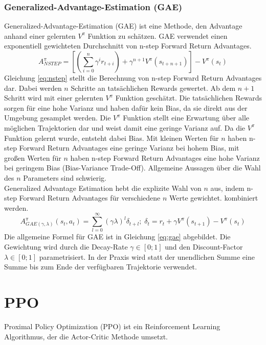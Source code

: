 \subsubsection{Generalized-Advantage-Estimation (GAE)}
Generalized-Advantage-Estimation (GAE) ist eine Methode, den Advantage anhand einer gelernten $V^\pi$ Funktion zu schätzen. GAE verwendet einen exponentiell gewichteten Durchschnitt von n-step Forward Return Advantages.
\begin{equation}
    A^\pi_{NSTEP} = \left[ (\sum_{i=0}^n \gamma^i r_{t+i}) + \gamma^{n+1} V^\pi (s_{t+n+1}) \right] - V^\pi(s_t)
    \label{eq:nstep}
\end{equation}
Gleichung \ref{eq:nstep} stellt die Berechnung von n-step Forward Return Advantages dar. Dabei werden $n$ Schritte an tatsächlichen Rewards gewertet. Ab dem $n+1$ Schritt wird mit einer gelernten $V^\pi$ Funktion geschätzt. Die tatsächlichen Rewards sorgen für eine hohe Varianz und haben dafür kein Bias, da sie direkt aus der Umgebung gesamplet werden. Die $V^\pi$ Funktion stellt eine Erwartung über alle möglichen Trajektorien dar und weist damit eine geringe Varianz auf. Da die $V^\pi$ Funktion gelernt wurde, entsteht dabei Bias. Mit kleinen Werten für $n$ haben n-step Forward Return Advantages eine geringe Varianz bei hohem Bias, mit großen Werten für $n$ haben n-step Forward Return Advantages eine hohe Varianz bei geringem Bias (Bias-Variance Trade-Off). Allgemeine Aussagen über die Wahl des $n$ Parameters sind schwierig.\\
Generalized Advantage Estimation hebt die explizite Wahl von $n$ aus, indem n-step Forward Return Advantages für verschiedene $n$ Werte gewichtet. kombiniert werden.
\begin{equation}
    A^\pi_{GAE(\gamma,\lambda)} (s_t,a_t) = \sum_{l=0}^\infty (\gamma\lambda)^l \delta_{t+l} ;\; \delta_t = r_t + \gamma V^\pi (s_{t+1}) - V^\pi(s_t)
    \label{eq:gae}
\end{equation}
Die allgemeine Formel für GAE ist in Gleichung \ref{eq:gae} abgebildet. Die Gewichtung wird durch die Decay-Rate $\gamma \in [0;1]$ und den Discount-Factor $\lambda \in [0;1]$ parametrisiert.
In der Praxis wird statt der unendlichen Summe eine Summe bis zum Ende der verfügbaren Trajektorie verwendet.


\section{PPO}
Proximal Policy Optimization (PPO) ist ein Reinforcement Learning Algorithmus, der die Actor-Critic Methode umsetzt.

